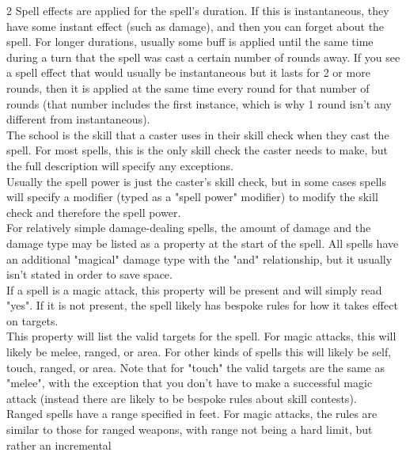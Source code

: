 \begin{multicols*}{2}
    {Spell effects are applied for the spell's duration. If this is
    instantaneous, they have some instant effect (such as damage),
    and then you can forget about the spell. For longer durations,
    usually some buff is applied until the same time during a turn
    that the spell was cast a certain number of rounds away. If you
    see a spell effect that would usually be instantaneous but it
    lasts for 2 or more rounds, then it is applied at the same time
    every round for that number of rounds (that number includes the
    first instance, which is why 1 round isn't any different from
    instantaneous).} \\
    {The school is the skill that a caster uses in their skill check
    when they cast the spell. For most spells, this is the only
    skill check the caster needs to make, but the full description
    will specify any exceptions.} \\
    {Usually the spell power is just the caster's skill check, but
    in some cases spells will specify a modifier (typed as a 
    "spell power" modifier) to modify the skill check and therefore
    the spell power.} \\
    {For relatively simple damage-dealing spells, the amount of
    damage and the damage type may be listed as a property at the
    start of the spell. All spells have an additional "magical"
    damage type with the "and" relationship, but it usually isn't
    stated in order to save space.} \\
    {If a spell is a magic attack, this property will be present
    and will simply read "yes". If it is not present, the spell
    likely has bespoke rules for how it takes effect on targets.} \\
    {This property will list the valid targets for the spell. For
    magic attacks, this will likely be melee, ranged, or area. For
    other kinds of spells this will likely be self, touch, ranged,
    or area. Note that for "touch" the valid targets are the same
    as "melee", with the exception that you don't have to make a
    successful magic attack (instead there are likely to be bespoke
    rules about skill contests).} \\
    {Ranged spells have a range specified in feet. For magic
    attacks, the rules are similar to those for ranged weapons,
    with range not being a hard limit, but rather an incremental
}
\end{multicols*}
